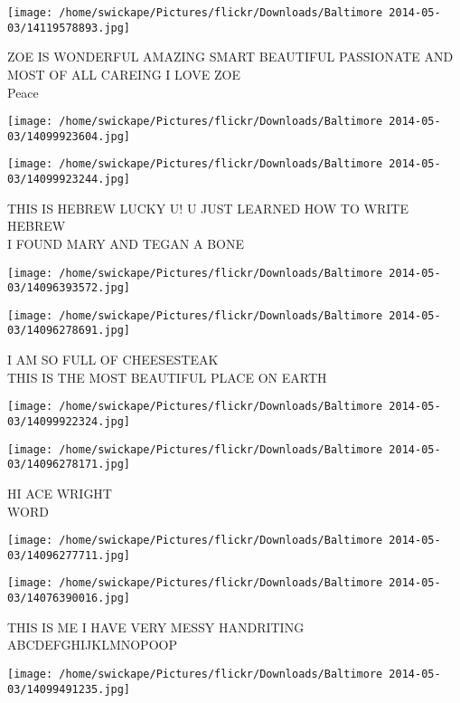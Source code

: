 \documentclass[10pt,letterpaper]{article}
\begin{document}
\vspace{0.25in}
\texttt{[image: /home/swickape/Pictures/flickr/Downloads/Baltimore 2014-05-03/14119578893.jpg]}

ZOE IS WONDERFUL AMAZING SMART BEAUTIFUL PASSIONATE AND MOST OF ALL CAREING I LOVE ZOE\\
Peace
\pagebreak

\texttt{[image: /home/swickape/Pictures/flickr/Downloads/Baltimore 2014-05-03/14099923604.jpg]}

\vspace{0.25in}
\texttt{[image: /home/swickape/Pictures/flickr/Downloads/Baltimore 2014-05-03/14099923244.jpg]}

THIS IS HEBREW LUCKY U! U JUST LEARNED HOW TO WRITE HEBREW\\
I FOUND MARY AND TEGAN A BONE
\pagebreak

\texttt{[image: /home/swickape/Pictures/flickr/Downloads/Baltimore 2014-05-03/14096393572.jpg]}

\vspace{0.25in}
\texttt{[image: /home/swickape/Pictures/flickr/Downloads/Baltimore 2014-05-03/14096278691.jpg]}

I AM SO FULL OF CHEESESTEAK\\
THIS IS THE MOST BEAUTIFUL PLACE ON EARTH
\pagebreak

\texttt{[image: /home/swickape/Pictures/flickr/Downloads/Baltimore 2014-05-03/14099922324.jpg]}

\vspace{0.25in}
\texttt{[image: /home/swickape/Pictures/flickr/Downloads/Baltimore 2014-05-03/14096278171.jpg]}

HI ACE WRIGHT\\
WORD
\pagebreak

\texttt{[image: /home/swickape/Pictures/flickr/Downloads/Baltimore 2014-05-03/14096277711.jpg]}

\vspace{0.25in}
\texttt{[image: /home/swickape/Pictures/flickr/Downloads/Baltimore 2014-05-03/14076390016.jpg]}

THIS IS ME I HAVE VERY MESSY HANDRITING\\
ABCDEFGHIJKLMNOPOOP
\pagebreak

\texttt{[image: /home/swickape/Pictures/flickr/Downloads/Baltimore 2014-05-03/14099491235.jpg]}
\end{document}
